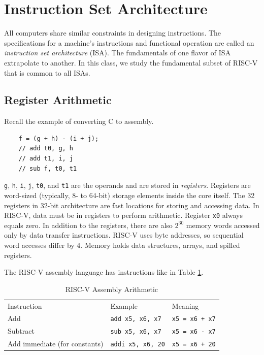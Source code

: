 \section{Instruction Set Architecture}

All computers share similar constraints in designing instructions.
The specifications for a machine's instructions and functional
operation are called an \emph{instruction set architecture} (ISA).
The fundamentals of one flavor of ISA extrapolate to another.
In this class, we study the fundamental subset of RISC-V that is common to all ISAs.

\subsection{Register Arithmetic}

Recall the example of converting C to assembly.
\begin{lstlisting}
    f = (g + h) - (i + j);
    // add t0, g, h
    // add t1, i, j
    // sub f, t0, t1
\end{lstlisting}

\texttt{g}, \texttt{h}, \texttt{i}, \texttt{j}, \texttt{t0},
and \texttt{t1} are the operands and are stored in \emph{registers}.
Registers are word-sized (typically, 8- to 64-bit) storage
elements inside the core itself.
The 32 registers in 32-bit architecture
are fast locations for storing and
accessing data. In RISC-V, data must be
in registers to perform arithmetic. Register
\texttt{x0} always equals zero.
In addition to the registers, there
are also $2^{30}$ memory words accessed
only by data transfer instructions.
RISC-V uses byte addresses, so sequential
word accesses differ by 4. Memory holds
data structures, arrays, and spilled
registers.

The RISC-V assembly language has
instructions like in Table \ref{tab:riscvasmarithmetic}.
\begin{table}[h!]
    \begin{tabular}{lll}
        Instruction                   & Example                  & Meaning               \\
        Add                           & \texttt{add x5, x6, x7}  & \texttt{x5 = x6 + x7} \\
        Subtract                      & \texttt{sub x5, x6, x7}  & \texttt{x5 = x6 - x7} \\
        Add immediate (for constants) & \texttt{addi x5, x6, 20} & \texttt{x5 = x6 + 20}
    \end{tabular}
    \caption{RISC-V Assembly Arithmetic}
    \label{tab:riscvasmarithmetic}
\end{table}

